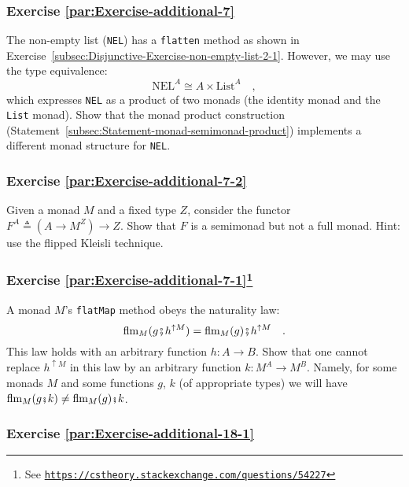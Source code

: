 \subsubsection{Exercise \label{par:Exercise-additional-7}\ref{par:Exercise-additional-7}}

The non-empty list (\lstinline!NEL!) has a \lstinline!flatten! method
as shown in Exercise~\ref{subsec:Disjunctive-Exercise-non-empty-list-2-1}.
However, we may use the type equivalence:
\[
\text{NEL}^{A}\cong A\times\text{List}^{A}\quad,
\]
which expresses \lstinline!NEL! as a product of two monads (the identity
monad and the \lstinline!List! monad). Show that the monad product
construction (Statement~\ref{subsec:Statement-monad-semimonad-product})
implements a different monad structure for \lstinline!NEL!.

\subsubsection{Exercise \label{par:Exercise-additional-7-2}\ref{par:Exercise-additional-7-2}}

Given a monad $M$ and a fixed type $Z$, consider the functor $F^{A}\triangleq(A\rightarrow M^{Z})\rightarrow Z$.
Show that $F$ is a semimonad but not a full monad. Hint: use the
flipped Kleisli technique.

\subsubsection{Exercise \label{par:Exercise-additional-7-1}\ref{par:Exercise-additional-7-1}\protect\footnote{See \texttt{\protect\href{https://cstheory.stackexchange.com/questions/54227}{https://cstheory.stackexchange.com/questions/54227}}}}

A monad $M$\textsf{'}s \lstinline!flatMap! method obeys the naturality law:
\[
\text{flm}_{M}(g\bef h^{\uparrow M})=\text{flm}_{M}(g)\bef h^{\uparrow M}\quad.
\]
This law holds with an arbitrary function $h:A\rightarrow B$. Show
that one cannot replace $h^{\uparrow M}$ in this law by an arbitrary
function $k:M^{A}\rightarrow M^{B}$. Namely, for some monads $M$
and some functions $g$, $k$ (of appropriate types) we will have
$\text{flm}_{M}(g\bef k)\neq\text{flm}_{M}(g)\bef k$.

\subsubsection{Exercise \label{par:Exercise-additional-18-1}\ref{par:Exercise-additional-18-1}}

